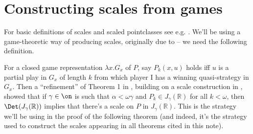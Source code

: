 \newcommand{\mytitle}{Characterisation of scaled pointclasses in $L(\mathbb R)$}
\newcommand{\myauthor}{Dan Saattrup Nielsen}
%
%




\section{Constructing scales from games}

For basic definitions of scales and scaled pointclasses see e.g. \cite{Kechris}. We'll be using a game-theoretic way of producing scales, originally due to \cite{Mos} -- we need the following definition.


For a closed game representation $\lambda x.G_x$ of $P$, say $P_k(x,u)$ holds iff $u$ is a partial play in $G_x$ of length $k$ from which player I has a winning quasi-strategy in $G_x$. Then a ``refinement'' of Theorem 1 in \cite{MS}, building on a scale construction in \cite{Mos}, showed that if $\gamma\in\on$ is such that $\alpha<\omega\gamma$ and $P_k\in J_\gamma(\mathbb R)$ for all $k<\omega$, then $\Det(J_\gamma(\mathbb R))$ implies that there's a scale on $P$ in $J_\gamma(\mathbb R)$. This is the strategy we'll be using in the proof of the following theorem (and indeed, it's the strategy used to construct the scales appearing in all theorems cited in this note).

